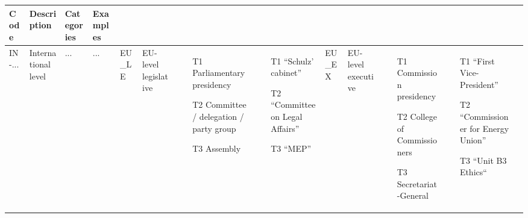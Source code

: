 \documentclass{article}
\begin{document}
    \begin{longtable}
        {|m{}|
          m{}|
          m{}| 
          m{}|} 

 Code & Description & Categories & Examples\\ \hline

         IN-... &
        International level &
    ... &

    ... &

    \hline

         EU\_LE &
        EU-level legislative &
  \begin{enumerate}
    \setlength\itemsep{0em}
      \item[T1] Parliamentary presidency
      \item[T2] Committee / delegation / party group
      \item[T3] Assembly
  \end{enumerate} &

  \begin{enumerate}
    \setlength\itemsep{0em}
      \item[T1] ``Schulz' cabinet''
      \item[T2] ``Committee on Legal Affairs”
      \item[T3] ``MEP”
  \end{enumerate} &
    \hline


         EU\_EX &
        EU-level executive &
  \begin{enumerate}
    \setlength\itemsep{0em}
      \item[T1] Commission presidency
      \item[T2] College of Commissioners
      \item[T3] Secretariat-General
  \end{enumerate} &

  \begin{enumerate}
    \setlength\itemsep{0em}
      \item[T1] ``First Vice-President''
      \item[T2] ``Commissioner for Energy Union''
      \item[T3] ``Unit B3 Ethics“
  \end{enumerate} &
    \hline


\end{longtable}
\end{document}
